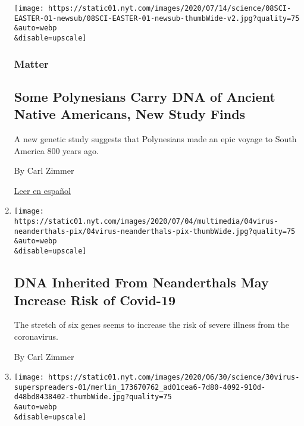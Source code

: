 \begin{enumerate}
  \texttt{[image: https://static01.nyt.com/images/2020/07/14/science/08SCI-EASTER-01-newsub/08SCI-EASTER-01-newsub-thumbWide-v2.jpg?quality=75\\\&auto=webp\\\&disable=upscale]}

  \hypertarget{matter-1}{%
  \subsubsection{Matter}\label{matter-1}}

  \hypertarget{some-polynesians-carry-dna-of-ancient-native-americans-new-study-finds}{%
  \subsection{Some Polynesians Carry DNA of Ancient Native Americans,
  New Study
  Finds}\label{some-polynesians-carry-dna-of-ancient-native-americans-new-study-finds}}

  A new genetic study suggests that Polynesians made an epic voyage to
  South America 800 years ago.

  By Carl Zimmer

  \href{https://www.nytimes.com/es/2020/07/10/espanol/ciencia-y-tecnologia/polinesios-estudio-genetico.html}{Leer
  en español}
\item
  \href{/2020/07/04/health/coronavirus-neanderthals.html}{}

  \texttt{[image: https://static01.nyt.com/images/2020/07/04/multimedia/04virus-neanderthals-pix/04virus-neanderthals-pix-thumbWide.jpg?quality=75\\\&auto=webp\\\&disable=upscale]}

  \hypertarget{dna-inherited-from-neanderthals-may-increase-risk-of-covid-19}{%
  \subsection{DNA Inherited From Neanderthals May Increase Risk of
  Covid-19}\label{dna-inherited-from-neanderthals-may-increase-risk-of-covid-19}}

  The stretch of six genes seems to increase the risk of severe illness
  from the coronavirus.

  By Carl Zimmer
\item
  \href{/es/2020/07/03/espanol/el-misterio-de-los-superpropagadores-de-coronavirus.html}{}

  \texttt{[image: https://static01.nyt.com/images/2020/06/30/science/30virus-superspreaders-01/merlin\_173670762\_ad01cea6-7d80-4092-910d-d48bd8438402-thumbWide.jpg?quality=75\\\&auto=webp\\\&disable=upscale]}


\end{enumerate}
